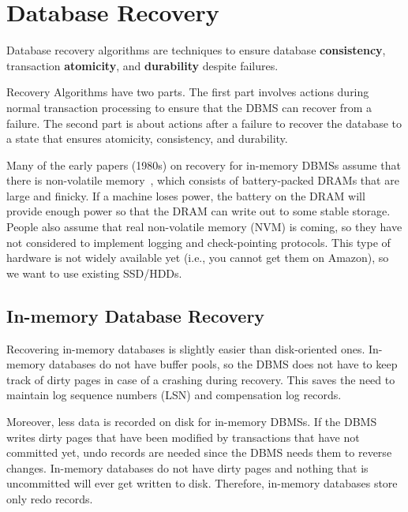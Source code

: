\documentclass[11pt]{article}
\begin{document}
\maketitle
\thispagestyle{plain}

\section{Database Recovery}
Database recovery algorithms are techniques to ensure database \textbf{consistency}, transaction \textbf{atomicity}, and \textbf{durability} despite failures.

Recovery Algorithms have two parts. The first part involves actions during normal transaction processing to ensure that the DBMS can recover from a failure. The second part is about actions after a failure to recover the database to a state that ensures atomicity, consistency, and durability.

Many of the early papers (1980s) on recovery for in-memory DBMSs assume that there is non-volatile memory~\cite{p104-lehman}, which consists of battery-packed DRAMs that are large and finicky. If a machine loses power, the battery on the DRAM will provide enough power so that the DRAM can write out to some stable storage. People also assume that real non-volatile memory (NVM) is coming, so they have not considered to implement logging and check-pointing protocols. This type of hardware is not widely available yet (i.e., you cannot get them on Amazon), so we want to use existing SSD/HDDs.

\subsection*{In-memory Database Recovery}
Recovering in-memory databases is slightly easier than disk-oriented ones. In-memory databases do not have buffer pools, so the DBMS does not have to keep track of dirty pages in case of a crashing during recovery. This saves the need to maintain log sequence numbers (LSN) and compensation log records.

Moreover, less data is recorded on disk for in-memory DBMSs. If the DBMS writes dirty pages that have been modified by transactions that have not committed yet, undo records are needed since the DBMS needs them to reverse changes. In-memory databases do not have dirty pages and nothing that is uncommitted will ever get written to disk. Therefore, in-memory databases store only redo records.
\end{document}
